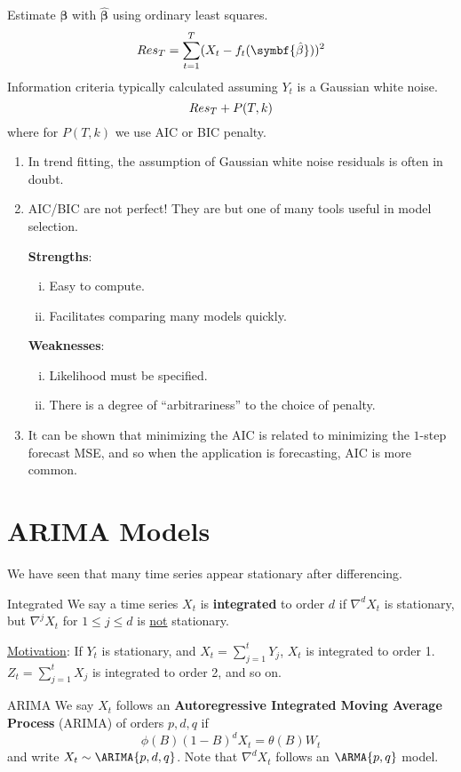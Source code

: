 Estimate $ \symbf{\beta} $ with $ \hat{\symbf{\beta}} $ using ordinary least squares.
\[ \SS{Res}_T=\sum_{t=1}^{T}(X_t-f_t(\symbf{\hat{\beta}}))^2 \]
Information criteria typically calculated assuming $ Y_t $ is a Gaussian white noise.
\[ \relax{Res}_T+P(T,k) \]
where for $ P(T,k) $ we use AIC or BIC penalty.
\begin{Remark}{}{}
    \begin{enumerate}[(1)]
        \item In trend fitting, the assumption of Gaussian white noise residuals is often in doubt.
        \item AIC/BIC are not perfect! They are but one of many tools useful in model selection.

              \textbf{Strengths}:
              \begin{enumerate}[(i)]
                  \item Easy to compute.
                  \item Facilitates comparing many models quickly.
              \end{enumerate}
              \textbf{Weaknesses}:
              \begin{enumerate}[(i)]
                  \item Likelihood must be specified.
                  \item There is a degree of ``arbitrariness'' to the choice of penalty.
              \end{enumerate}
        \item It can be shown that minimizing the AIC is related to minimizing
              the $ 1 $-step forecast MSE, and so when the application is forecasting,
              AIC is more common.
    \end{enumerate}
\end{Remark}
\section{ARIMA Models}
We have seen that many time series appear stationary after differencing.
\begin{Definition}{Integrated}{}
    We say a time series $ X_t $ is \textbf{integrated} to order $ d $
    if $ \nabla^d X_t $ is stationary, but $ \nabla^j X_t $
    for $ 1\le j\le d $ is \underline{not} stationary.
\end{Definition}
\underline{Motivation}: If $ Y_t $ is stationary,
and $ X_t=\sum_{j=1}^{t} Y_j $, $ X_t $ is integrated to order 1.
$ Z_t=\sum_{j=1}^{t} X_j $ is integrated to order 2, and so on.
\begin{Definition}{ARIMA}{}
    We say $ X_t $ follows an \textbf{Autoregressive Integrated Moving Average Process}
    (ARIMA) of orders $ p,d,q $ if
    \[ \phi(B)(1-B)^d X_t=\theta(B)W_t \]
    and write $ X_t \sim \ARIMA{p,d,q} $. Note that $ \nabla^d X_t $
    follows an $ \ARMA{p,q} $ model.
\end{Definition}
